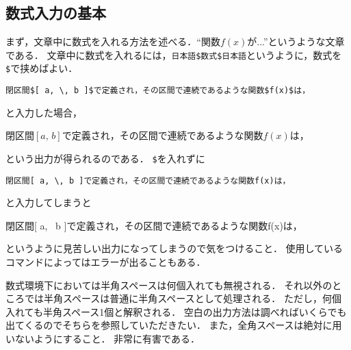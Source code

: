 \subsection{数式入力の基本}
まず，文章中に数式を入れる方法を述べる．``関数$f(x)$が...''というような文章である．
文章中に数式を入れるには，\verb|日本語$数式$日本語|というように，数式を\verb|$|で挟めばよい．
\begin{verbatim}
閉区間$[ a, \, b ]$で定義され，その区間で連続であるような関数$f(x)$は，
\end{verbatim}
と入力した場合，
\begin{oframed}
閉区間$[ a, \, b ]$で定義され，その区間で連続であるような関数$f(x)$は，
\end{oframed}
という出力が得られるのである．
\verb|$|を入れずに
\begin{verbatim}
閉区間[ a, \, b ]で定義され，その区間で連続であるような関数f(x)は，
\end{verbatim}
と入力してしまうと
\begin{oframed}
閉区間[ a, \, b ]で定義され，その区間で連続であるような関数f(x)は，
\end{oframed}
というように見苦しい出力になってしまうので気をつけること．
使用しているコマンドによってはエラーが出ることもある．

数式環境下においては半角スペースは何個入れても無視される．
それ以外のところでは半角スペースは普通に半角スペースとして処理される．
ただし，何個入れても半角スペース1個と解釈される．
空白の出力方法は調べればいくらでも出てくるのでそちらを参照していただきたい．
また，全角スペースは絶対に用いないようにすること．
非常に有害である．

